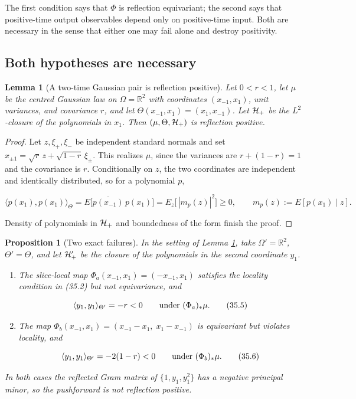 \documentclass[11pt]{article}
\newtheorem{proposition}[theorem]{Proposition}
\newtheorem{lemma}[theorem]{Lemma}
\theoremstyle{remark}
\begin{document}
The first condition says that \(\Phi\) is reflection equivariant; the
second says that positive-time output observables depend only on
positive-time input.  Both are necessary in the sense that either one may
fail alone and destroy positivity.

\subsection{Both hypotheses are necessary}

\begin{lemma}[A two-time Gaussian pair is reflection positive]
\label{lem:v19v32-pair}
Let \(0<r<1\), let \(\mu\) be the centred Gaussian law on
\(\Omega=\mathbb R^2\) with coordinates \((x_{-1},x_1)\), unit variances,
and covariance \(r\), and let \(\Theta(x_{-1},x_1)=(x_1,x_{-1})\).  Let
\({\cal H}_+\) be the \(L^2\)-closure of the polynomials in \(x_1\).
Then \((\mu,\Theta,{\cal H}_+)\) is reflection positive.
\end{lemma}

\begin{proof}
Let \(z,\xi_+,\xi_-\) be independent standard normals and set
\(x_{\pm1}=\sqrt r\,z+\sqrt{1-r}\,\xi_\pm\).  This realizes \(\mu\),
since the variances are \(r+(1-r)=1\) and the covariance is \(r\).
Conditionally on \(z\), the two coordinates are independent and
identically distributed, so for a polynomial \(p\),

\[
 \langle p(x_1),p(x_1)\rangle_\Theta
 =E\bigl[\overline{p(x_{-1})}\,p(x_1)\bigr]
 =E_z\bigl[\,|m_p(z)|^2\bigr]\geq0,
 \qquad m_p(z):=E[p(x_1)\mid z].                               \tag{35.4}
\]

Density of polynomials in \({\cal H}_+\) and boundedness of the form
finish the proof.
\end{proof}

\begin{proposition}[Two exact failures]
\label{prop:v19v32-failures}
In the setting of Lemma \ref{lem:v19v32-pair}, take
\(\Omega'=\mathbb R^2\), \(\Theta'=\Theta\), and let \({\cal H}'_+\) be
the closure of the polynomials in the second coordinate \(y_1\).
\begin{enumerate}
\item The slice-local map \(\Phi_a(x_{-1},x_1)=(-x_{-1},x_1)\) satisfies
      the locality condition in (35.2) but not equivariance, and

\[
 \langle y_1,y_1\rangle_{\Theta'}=-r<0
 \qquad\hbox{under }(\Phi_a)_*\mu.                              \tag{35.5}
\]

\item The map \(\Phi_b(x_{-1},x_1)=(x_{-1}-x_1,\;x_1-x_{-1})\) is
      equivariant but violates locality, and

\[
 \langle y_1,y_1\rangle_{\Theta'}=-2(1-r)<0
 \qquad\hbox{under }(\Phi_b)_*\mu.                              \tag{35.6}
\]
\end{enumerate}
In both cases the reflected Gram matrix of \(\{1,y_1,y_1^2\}\) has a
negative principal minor, so the pushforward is not reflection positive.
\end{proposition}
\end{document}
